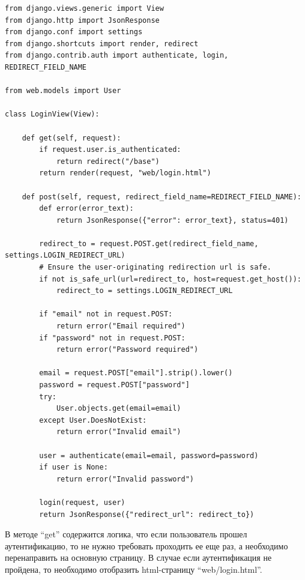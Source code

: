 \begin{lstlisting}[style=py]
from django.views.generic import View
from django.http import JsonResponse
from django.conf import settings
from django.shortcuts import render, redirect
from django.contrib.auth import authenticate, login, REDIRECT_FIELD_NAME

from web.models import User

class LoginView(View):

    def get(self, request):
        if request.user.is_authenticated:
            return redirect("/base")
        return render(request, "web/login.html")

    def post(self, request, redirect_field_name=REDIRECT_FIELD_NAME):
        def error(error_text):
            return JsonResponse({"error": error_text}, status=401)

        redirect_to = request.POST.get(redirect_field_name, settings.LOGIN_REDIRECT_URL)
        # Ensure the user-originating redirection url is safe.
        if not is_safe_url(url=redirect_to, host=request.get_host()):
            redirect_to = settings.LOGIN_REDIRECT_URL

        if "email" not in request.POST:
            return error("Email required")
        if "password" not in request.POST:
            return error("Password required")

        email = request.POST["email"].strip().lower()
        password = request.POST["password"]
        try:
            User.objects.get(email=email)
        except User.DoesNotExist:
            return error("Invalid email")

        user = authenticate(email=email, password=password)
        if user is None:
            return error("Invalid password")

        login(request, user)
        return JsonResponse({"redirect_url": redirect_to})
\end{lstlisting}
В методе “get” содержится логика, что если пользователь прошел аутентификацию, то не нужно требовать проходить ее еще раз,
а необходимо перенаправить на основную страницу. В случае если аутентификация не пройдена, то необходимо отобразить
html-страницу “web/login.html”.

